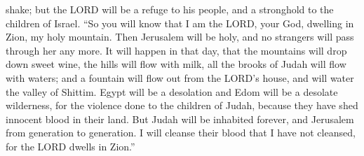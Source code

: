 shake; but the LORD will be a refuge to his people, and a stronghold to
the children of Israel.  ``So you will know that I am the
LORD, your God, dwelling in Zion, my holy mountain. Then Jerusalem will
be holy, and no strangers will pass through her any more.
 It will happen in that day, that the mountains will drop
down sweet wine, the hills will flow with milk, all the brooks of Judah
will flow with waters; and a fountain will flow out from the LORD's
house, and will water the valley of Shittim.  Egypt will
be a desolation and Edom will be a desolate wilderness, for the violence
done to the children of Judah, because they have shed innocent blood in
their land.  But Judah will be inhabited forever, and
Jerusalem from generation to generation.  I will cleanse
their blood that I have not cleansed, for the LORD dwells in Zion.''
